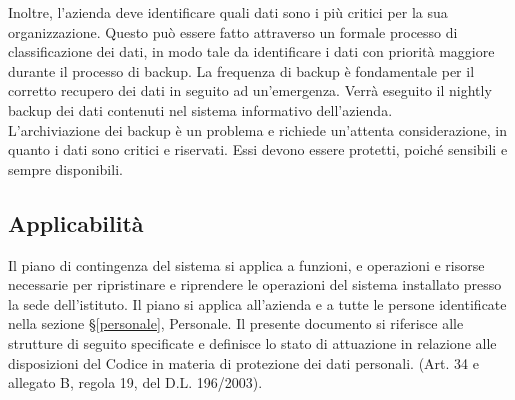 \documentclass[12pt, a4paper, titlepage]{report}
\begin{document}
		Inoltre, l'azienda deve identificare quali dati sono i più critici per la sua organizzazione. Questo può essere fatto attraverso un formale processo di classificazione dei dati, in modo tale da identificare i dati con priorità maggiore durante il processo di backup. La frequenza di backup è fondamentale per il corretto recupero dei dati in seguito ad un'emergenza. Verrà eseguito il nightly backup dei dati contenuti nel sistema informativo dell'azienda. \\
		L'archiviazione dei backup è un problema e richiede un'attenta considerazione, in quanto i dati sono critici e riservati. Essi devono essere protetti, poiché sensibili e sempre disponibili.

		\subsection{Applicabilità} \label{applicabilita}
		
		Il piano di contingenza del sistema si applica a funzioni, e operazioni e risorse necessarie per ripristinare e riprendere le operazioni del sistema installato presso la sede dell'istituto. Il piano si applica all'azienda e a tutte le persone identificate nella sezione §\ref{personale}, Personale.
		Il presente documento si riferisce alle strutture di seguito specificate e definisce lo stato di attuazione in relazione alle disposizioni del Codice in materia di protezione dei dati personali. (Art. 34 e allegato B, regola 19, del D.L. 196/2003).
		
\end{document}
